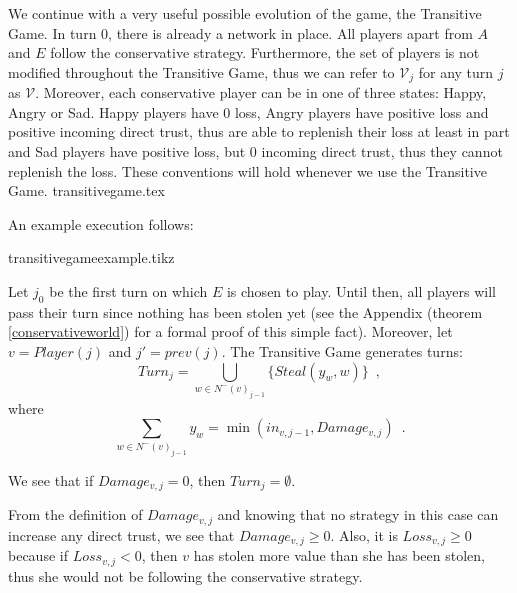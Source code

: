    We continue with a very useful possible evolution of the game, the Transitive Game. In turn 0, there is already a network
   in place. All players apart from $A$ and $E$ follow the conservative strategy. Furthermore, the set of players is not
   modified throughout the Transitive Game, thus we can refer to $\mathcal{V}_j$ for any turn $j$ as $\mathcal{V}$.
   Moreover, each conservative player can be in one of three states: Happy, Angry or Sad. Happy players have 0 loss, Angry
   players have positive loss and positive incoming direct trust, thus are able to replenish their loss at least in part and
   Sad players have positive loss, but 0 incoming direct trust, thus they cannot replenish the loss. These conventions will
   hold whenever we use the Transitive Game.
   {transitivegame.tex}

   An example execution follows:

   {transitivegameexample.tikz}

   Let $j_0$ be the first turn on which $E$ is chosen to play. Until then, all players will pass their turn since nothing
   has been stolen yet (see the Appendix (theorem \ref{conservativeworld}) for a formal proof of this simple fact).
   Moreover, let $v = Player(j)$ and $j' = prev\left(j\right)$.
   The Transitive Game generates turns:
   \begin{equation}
      Turn_j = \bigcup\limits_{w \in N^{-}\left(v\right)_{j-1}}\{Steal\left(y_w,w\right)\} \enspace,
   \end{equation}
   where
   \begin{equation*}
      \sum\limits_{w \in N^{-}\left(v\right)_{j-1}}y_w = \min\left(in_{v, j-1}, Damage_{v, j}\right) \enspace.
   \end{equation*}
 
   We see that if $Damage_{v, j} = 0$, then $Turn_j = \emptyset$.

   From the definition of $Damage_{v,j}$ and knowing that no strategy in this case can increase any direct trust, we see
   that $Damage_{v,j} \geq 0$. Also, it is $Loss_{v,j} \geq 0$ because if $Loss_{v,j} < 0$, then $v$ has
   stolen more value than she has been stolen, thus she would not be following the conservative strategy.
